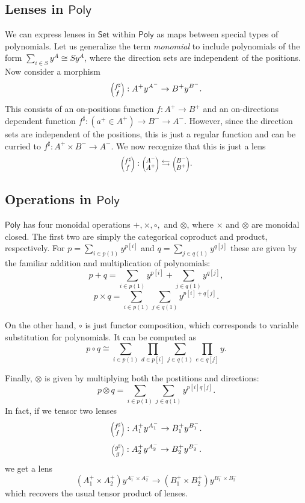 \documentclass[12pt, a4paper]{article}
\theoremstyle{definition}
\theoremstyle{plain}
\theoremstyle{plain}
\theoremstyle{plain}
\theoremstyle{plain}
\theoremstyle{plain}
\theoremstyle{remark}
\theoremstyle{remark}
\newcommand{\lens}[2]{\scaleobj{0.6}{\begin{pmatrix} \scaleobj{1.3}{{#1}} \\ \scaleobj{1.3}{{#2}} \end{pmatrix}}}
\begin{document}
\subsection{Lenses in $\mathsf{Poly}$}
We can express lenses in $\mathsf{Set}$ within $\mathsf{Poly}$ as maps between special types of polynomials. Let us generalize the term \emph{monomial} to include polynomials of the form $\sum_{i \in S} y^{A} \cong S y^A$, where the direction sets are independent of the positions. Now consider a morphism
$$\lens{f^\sharp}{f} :A^+ y^{A^-} \rightarrow B^+ y^{B^-} .$$
This consists of an on-positions function $f: A^+ \rightarrow B^+$ and an on-directions dependent function $f^\sharp : (a^+ \in A^+) \rightarrow B^- \rightarrow A^-$. However, since the direction sets are independent of the positions, this is just a regular function and can be curried to $f^\sharp: A^+ \times B^- \rightarrow A^-$. We now recognize that this is just a lens
$$\lens{f^\sharp}{f} : \lens{A^-}{A^+} \leftrightarrows \lens{B^-}{B^+}.$$

\subsection{Operations in $\mathsf{Poly}$}
$\mathsf{Poly}$ has four monoidal operations $+, \times,\circ,$ and $\otimes$, where $\times$ and $\otimes$ are monoidal closed. The first two are simply the categorical coproduct and product, respectively. For $p = \sum_{i \in p(1)} y^{p[i]}$ and $q = \sum_{j \in q(1)} y^{q[j]}$ these are given by the familiar addition and multiplication of polynomials:
$$p + q = \sum_{i \in p(1)} y^{p[i]} + \sum_{j \in q(1)} y^{q[j]},$$
$$p \times q = \sum_{i \in p(1)}\sum_{j \in q(1)} y^{p[i]+q[j]}.$$

On the other hand, $\circ$ is just functor composition, which corresponds to variable substitution for polynomials. It can be computed as
$$p \circ q \cong \sum_{i \in p(1)} \prod_{d \in p[i]} \sum_{j \in q(1)} \prod_{e \in q[j]} y .$$

Finally, $\otimes$ is given by multiplying both the postitions and directions:
$$p \otimes q = \sum_{i \in p(1)} \sum_{j \in q(1)} y^{p[i]q[j]}.$$
In fact, if we tensor two lenses 
$$\lens{f^\sharp}{f} :A^+_1 y^{A^-_1} \rightarrow B^+_1 y^{B^-_1} .$$
$$\lens{g^\sharp}{g} :A^+_2 y^{A^-_2} \rightarrow B^+_2 y^{B^-_2} .$$
we get a lens
$$(A^+_1 \times A^+_2)  y^{A^-_1 \times A^-_2} \rightarrow (B^+_1 \times B^+_2)y^{B^-_1 \times B^-_2}$$
which recovers the usual tensor product of lenses.
\end{document}
